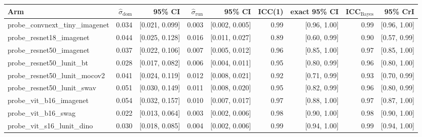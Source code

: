 \begin{tabular}{lrrrrrrrr}
\toprule
Arm & $\hat\sigma_\text{dom}$ & 95\% CI & $\hat\sigma_\text{run}$ & 95\% CI & ICC(1) & exact 95\% CI & ICC$_\text{Bayes}$ & 95\% CrI \\
\midrule
probe\_convnext\_tiny\_imagenet & 0.034 & [0.021, 0.099] & 0.003 & [0.002, 0.005] & 0.99 & [0.96, 1.00] & 0.99 & [0.96, 1.00] \\
probe\_resnet18\_imagenet & 0.044 & [0.025, 0.128] & 0.016 & [0.011, 0.027] & 0.89 & [0.60, 0.99] & 0.90 & [0.57, 0.99] \\
probe\_resnet50\_imagenet & 0.037 & [0.022, 0.106] & 0.007 & [0.005, 0.012] & 0.96 & [0.85, 1.00] & 0.97 & [0.85, 1.00] \\
probe\_resnet50\_lunit\_bt & 0.028 & [0.017, 0.082] & 0.006 & [0.004, 0.011] & 0.95 & [0.80, 0.99] & 0.96 & [0.80, 1.00] \\
probe\_resnet50\_lunit\_mocov2 & 0.041 & [0.024, 0.119] & 0.012 & [0.008, 0.021] & 0.92 & [0.71, 0.99] & 0.93 & [0.70, 0.99] \\
probe\_resnet50\_lunit\_swav & 0.051 & [0.030, 0.149] & 0.011 & [0.008, 0.020] & 0.95 & [0.82, 0.99] & 0.96 & [0.80, 0.99] \\
probe\_vit\_b16\_imagenet & 0.054 & [0.032, 0.157] & 0.010 & [0.007, 0.017] & 0.97 & [0.88, 1.00] & 0.97 & [0.87, 1.00] \\
probe\_vit\_b16\_swag & 0.022 & [0.013, 0.064] & 0.003 & [0.002, 0.006] & 0.98 & [0.90, 1.00] & 0.98 & [0.90, 1.00] \\
probe\_vit\_s16\_lunit\_dino & 0.030 & [0.018, 0.085] & 0.004 & [0.002, 0.006] & 0.99 & [0.94, 1.00] & 0.99 & [0.94, 1.00] \\
\bottomrule
\end{tabular}

